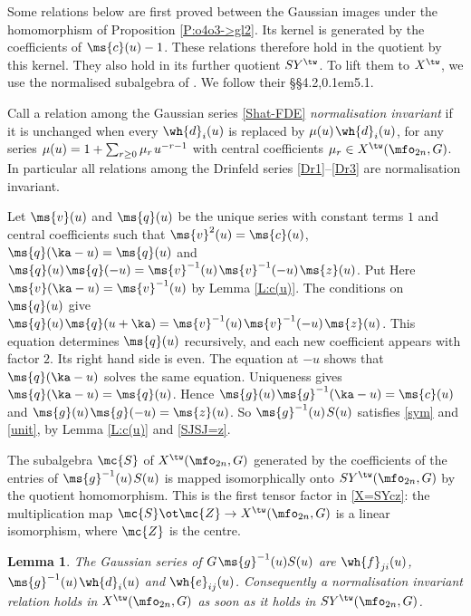 \documentclass{amsart}
\newtheorem{lemma}[theorem]{Lemma}
\numberwithin{equation}{section}
\theoremstyle{remark}
\renewcommand{\,}{\kern 0.1em} %
\begin{document}
Some relations below are first proved between the Gaussian images under the homomorphism of
Proposition \ref{P:o4o3->gl2}. Its kernel is generated by the coefficients of $\ms{c}(u)-1$. These
relations therefore hold in the quotient by this kernel. They also hold in its further quotient
$SY^\tw$. To lift them to $X^\tw$, we use the normalised subalgebra of
\cite[Thms.~4.2, 5.3]{GR16}. We follow their \S\S4.2,\,5.1.

Call a relation among the Gaussian series \eqref{Shat-FDE} {\it normalisation invariant} if it is
unchanged when every $\wh{d}_i(u)$ is replaced by $\mu(u)\,\wh{d}_i(u)$, for any series
$\mu(u) = 1 + \sum_{r\ge0} \mu_r\,u^{-r-1}$ with central coefficients $\mu_r\in X^\tw(\mfo_{2n},G)$.
In particular all relations among the Drinfeld series \eqref{Dr1}--\eqref{Dr3} are normalisation
invariant.

Let $\ms{v}(u)$ and $\ms{q}(u)$ be the unique series with constant terms $1$ and central
coefficients such that $\ms{v}^2(u)=\ms{c}(u)$, $\ms{q}(\ka-u)=\ms{q}(u)$ and
$\ms{q}(u)\,\ms{q}(-u)=\ms{v}^{-1}(u)\,\ms{v}^{-1}(-u)\,\ms{z}(u)$. Put
%
\equ{
\ms{g}(u) := \ms{v}(u)\,\ms{q}(u) .
\label{g(u)}
}
%
Here $\ms{v}(\ka-u)=\ms{v}^{-1}(u)$ by Lemma \ref{L:c(u)}. The conditions on $\ms{q}(u)$ give
$\ms{q}(u)\,\ms{q}(u+\ka)=\ms{v}^{-1}(u)\,\ms{v}^{-1}(-u)\,\ms{z}(u)$. This equation determines
$\ms{q}(u)$ recursively, and each new coefficient appears with factor $2$. Its right hand side is
even. The equation at $-u$ shows that $\ms{q}(\ka-u)$ solves the same equation. Uniqueness gives
$\ms{q}(\ka-u)=\ms{q}(u)$.
Hence $\ms{g}(u)\,\ms{g}^{-1}(\ka-u)=\ms{c}(u)$ and $\ms{g}(u)\,\ms{g}(-u)=\ms{z}(u)$. So
$\ms{g}^{-1}(u)\,S(u)$ satisfies \eqref{sym} and \eqref{unit}, by Lemma \ref{L:c(u)} and
\eqref{SJSJ=z}.

The subalgebra $\mc{S}$ of $X^\tw(\mfo_{2n},G)$ generated by the
coefficients of the entries of $\ms{g}^{-1}(u)\,S(u)$ is mapped isomorphically onto
$SY^\tw(\mfo_{2n},G)$ by the quotient homomorphism. This is the first tensor factor in
\eqref{X=SYcz}: the multiplication map $\mc{S}\ot\mc{Z}\to X^\tw(\mfo_{2n},G)$ is a linear
isomorphism, where $\mc{Z}$ is the centre.

\begin{lemma} \label{L:X-vs-SY}
%
The Gaussian series of $G\,\ms{g}^{-1}(u)S(u)$ are $\wh{f}_{ji}(u)$, $\ms{g}^{-1}(u)\,\wh{d}_i(u)$
and $\wh{e}_{ij}(u)$. Consequently a normalisation invariant relation holds in
$X^\tw(\mfo_{2n},G)$ as soon as it holds in $SY^\tw(\mfo_{2n},G)$.
%
\end{lemma}
\end{document}
